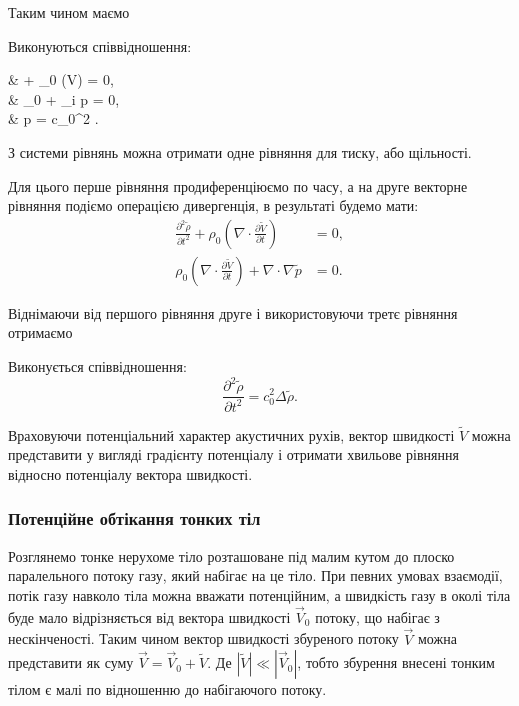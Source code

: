 Таким чином маємо
\begin{th_equation}
	Виконуються співвідношення:
	\begin{system}
		&  + \rho_0 (\nabla \cdot \tilde V) = 0, \\
		& \rho_0 \cdot {} + \nabla_i \tilde p = 0, \\
		& \tilde p = c_0^2 \tilde \rho.
	\end{system}
\end{th_equation}

З системи рівнянь можна отримати одне рівняння для тиску, або щільності. \medskip

Для цього перше рівняння продиференціюємо по часу, а на друге векторне рівняння подіємо операцією дивергенція, в результаті будемо мати:
\begin{align}
	\frac{\partial^2 \tilde \rho}{\partial t^2} + \rho_0 \left( \nabla \cdot \frac{\partial \tilde V}{\partial t} \right) &= 0, \\
	\rho_0 \left( \nabla \cdot \frac{\partial \tilde V}{\partial t} \right) + \nabla \cdot \nabla \tilde p &= 0.
\end{align}

Віднімаючи від першого рівняння друге і використовуючи третє рівняння отримаємо
\begin{th_equation}[хвильове]
	Виконується співвідношення:
	\begin{equation}
		\frac{\partial^2 \tilde \rho}{\partial t^2} = c_0^2 \Delta \tilde \rho.
	\end{equation}
\end{th_equation}

Враховуючи потенціальний характер акустичних рухів, вектор швидкості $\tilde V$ можна представити у вигляді градієнту потенціалу і отримати хвильове рівняння відносно потенціалу вектора швидкості.

\subsubsection{Потенційне обтікання тонких тіл}

Розглянемо тонке нерухоме тіло розташоване під малим кутом до плоско паралельного потоку газу, який набігає на це тіло. При певних умовах взаємодії, потік газу навколо тіла можна вважати потенційним, а швидкість газу в околі тіла буде мало відрізняється від вектора швидкості $\vec V_0$ потоку, що набігає з нескінченості. Таким чином вектор швидкості збуреного потоку $\vec V$ можна представити як суму $\vec V = \vec V_0 + \tilde V$. Де $|\tilde V| \ll |\vec V_0|$, тобто збурення внесені тонким тілом є малі по відношенню до набігаючого потоку. \medskip

